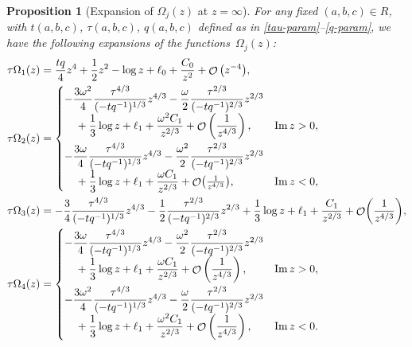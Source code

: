 \documentclass[pdftex]{sigma}
\DeclareMathOperator{\OO}{\mathcal{O}}
\numberwithin{equation}{section}
\newtheorem{Proposition}[Theorem]{Proposition}
 { \theoremstyle{definition}
\newtheorem{Definition}[Theorem]{Definition}
\newtheorem{Note}[Theorem]{Note}
\newtheorem{Example}[Theorem]{Example}
\newtheorem{Remark}[Theorem]{Remark} }
\begin{document}
 \begin{Proposition}[Expansion of $\Omega_j(z)$ at $z=\infty$] For any fixed $(a,b,c)\in R$, with $t(a,b,c)$, $\tau(a,b,c)$, $q(a,b,c)$ defined as in
 \eqref{tau-param}--\eqref{q-param}, we have the following expansions of the functions~$\Omega_j(z)$:
 \begin{align}
 &\tau \Omega_1(z) = \frac{t q}{4}z^4 + \frac{1}{2}z^2 - \log z + \ell_0 + \frac{C_0}{z^2} + \OO\big(z^{-4}\big), \label{Omega-Sheet-1-infty}\\
 &\tau \Omega_{2}(z) = \begin{cases}
 -\dfrac{3\omega^2}{4}\dfrac{\tau^{4/3}}{(-tq^{-1})^{1/3}}z^{4/3} - \dfrac{\omega}{2} \dfrac{\tau^{2/3}}{(-tq^{-1})^{2/3}} z^{2/3} & \\
 \quad{}+ \dfrac{1}{3}\log z+ \ell_1 + \dfrac{\omega^2 C_1}{z^{2/3}} + \OO\left(\dfrac{1}{z^{4/3}}\right), & \operatorname{Im} z > 0, \vspace{1mm}\\
 -\dfrac{3\omega}{4}\dfrac{\tau^{4/3}}{(-tq^{-1})^{1/3}}z^{4/3} - \dfrac{\omega^2}{2} \dfrac{\tau^{2/3}}{(-tq^{-1})^{2/3}} z^{2/3} & \\
 \quad{} + \dfrac{1}{3}\log z+ \ell_1 + \dfrac{\omega C_1}{z^{2/3}}+ \OO\bigl(\frac{1}{z^{4/3}}\bigr), & \operatorname{Im} z < 0,
 \end{cases} \label{Omega-Sheet-2-infty}\\
 &\tau \Omega_{3}(z) = -\frac{3}{4}\frac{\tau^{4/3}}{(-tq^{-1})^{1/3}}z^{4/3} - \frac{1}{2} \frac{\tau^{2/3}}{(-tq^{-1})^{2/3}} z^{2/3} + \frac{1}{3}\log z + \ell_1 + \frac{C_1}{z^{2/3}} + \OO\biggl(\frac{1}{z^{4/3}}\biggr),\label{Omega-Sheet-3-infty}\\
 &\tau \Omega_{4}(z) = \begin{cases}
 -\dfrac{3\omega}{4}\dfrac{\tau^{4/3}}{(-tq^{-1})^{1/3}}z^{4/3} - \dfrac{\omega^2}{2} \dfrac{\tau^{2/3}}{(-tq^{-1})^{2/3}} z^{2/3} & \\
 \quad{} + \dfrac{1}{3}\log z+ \ell_1 + \dfrac{\omega C_1}{z^{2/3}}+ \OO\left(\dfrac{1}{z^{4/3}}\right), & \operatorname{Im} z > 0, \vspace{1mm}\\
 -\dfrac{3\omega^2}{4}\dfrac{\tau^{4/3}}{(-tq^{-1})^{1/3}}z^{4/3} - \dfrac{\omega}{2} \dfrac{\tau^{2/3}}{(-tq^{-1})^{2/3}} z^{2/3} &\\
 \quad{} + \dfrac{1}{3}\log z+ \ell_1 + \dfrac{\omega^2 C_1}{z^{2/3}} + \OO\left(\dfrac{1}{z^{4/3}}\right),& \operatorname{Im} z < 0.
 \end{cases}\label{Omega-Sheet-4-infty}

\end{align}
\end{Proposition}
\end{document}
